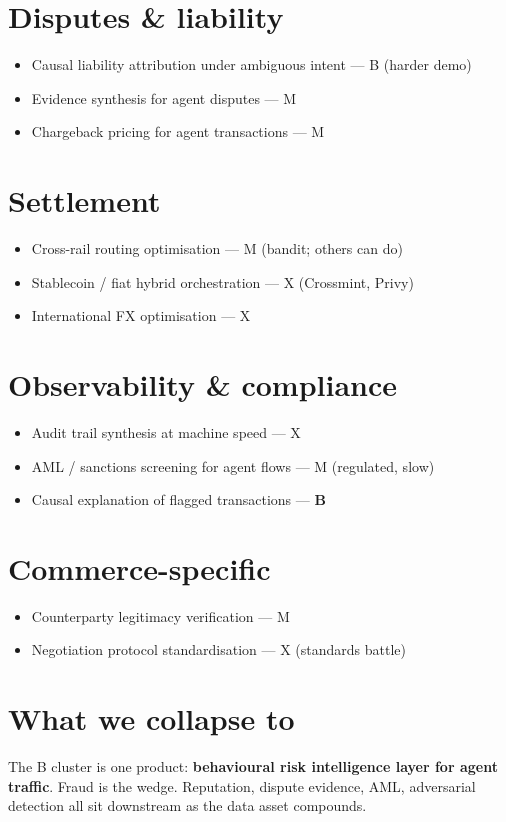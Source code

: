 \documentclass[11pt]{article}
\begin{document}
\section{Disputes \& liability}
\begin{itemize}
  \item Causal liability attribution under ambiguous intent --- B (harder demo)
  \item Evidence synthesis for agent disputes --- M
  \item Chargeback pricing for agent transactions --- M
\end{itemize}
\section{Settlement}
\begin{itemize}
  \item Cross-rail routing optimisation --- M (bandit; others can do)
  \item Stablecoin / fiat hybrid orchestration --- X (Crossmint, Privy)
  \item International FX optimisation --- X
\end{itemize}
\section{Observability \& compliance}
\begin{itemize}
  \item Audit trail synthesis at machine speed --- X
  \item AML / sanctions screening for agent flows --- M (regulated, slow)
  \item Causal explanation of flagged transactions --- \textbf{B}
\end{itemize}
\section{Commerce-specific}
\begin{itemize}
  \item Counterparty legitimacy verification --- M
  \item Negotiation protocol standardisation --- X (standards battle)
\end{itemize}
\section{What we collapse to}
The B cluster is one product: \textbf{behavioural risk intelligence layer for agent traffic}. Fraud is the wedge. Reputation, dispute evidence, AML, adversarial detection all sit downstream as the data asset compounds.
\end{document}
